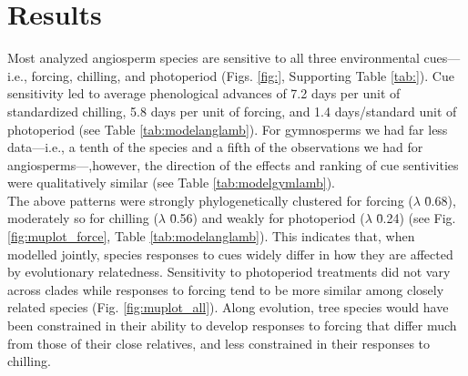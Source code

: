 \documentclass{article}\usepackage[]{graphicx}\usepackage[]{color}
\begin{document}





\section*{Results}
Most analyzed angiosperm species are sensitive to all three environmental cues---i.e., forcing, chilling, and photoperiod (Figs. \ref{fig:}, Supporting Table \ref{tab:}). Cue sensitivity led to average phenological advances of 7.2 days per unit of standardized chilling, 5.8 days per unit of forcing, and 1.4 days/standard unit of photoperiod (see Table \ref{tab:modelanglamb}). For gymnosperms we had far less data---i.e., a tenth of the species and a fifth of the observations we had for angiosperms---,however, the direction of the effects and ranking of cue sentivities were qualitatively similar (see Table \ref{tab:modelgymlamb}).\\ %

The above patterns were strongly phylogenetically clustered for forcing ($\lambda$ \= 0.68), moderately so for chilling ($\lambda$ \= 0.56) and weakly for photoperiod ($\lambda$ \= 0.24) (see Fig. \ref{fig:muplot_force}, Table \ref{tab:modelanglamb}). This indicates that, when modelled jointly, species responses to cues widely differ in how they are affected by evolutionary relatedness. Sensitivity to photoperiod treatments did not vary across clades while responses to forcing tend to be more similar among closely related species (Fig. \ref{fig:muplot_all}). Along evolution, tree species would have been constrained %
in their ability to develop responses to forcing that differ much from those of their close relatives, and less constrained in their responses to chilling.\\
\end{document}
